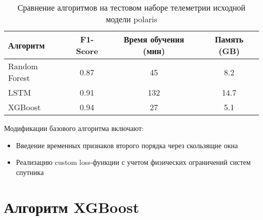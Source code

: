\begin{table}[h]
	\centering
	\begin{tabular}{|l|c|c|c|}
		\hline
		\textbf{Алгоритм} & \textbf{F1-Score} & \textbf{Время обучения (мин)} & \textbf{Память (GB)} \\
		\hline
		Random Forest     & 0.87              & 45                            & 8.2                  \\
		LSTM              & 0.91              & 132                           & 14.7                 \\
		XGBoost           & 0.94              & 27                            & 5.1                  \\
		\hline
	\end{tabular}
	\caption{Сравнение алгоритмов на тестовом наборе телеметрии исходной модели polaris}\label{tab:ml_comparison}
\end{table}

Модификации базового алгоритма включают:
\begin{itemize}
	\item Введение временных признаков второго порядка через скользящие окна
	\item Реализацию custom loss-функции с учетом физических ограничений систем спутника
\end{itemize}

\section{Алгоритм XGBoost}

